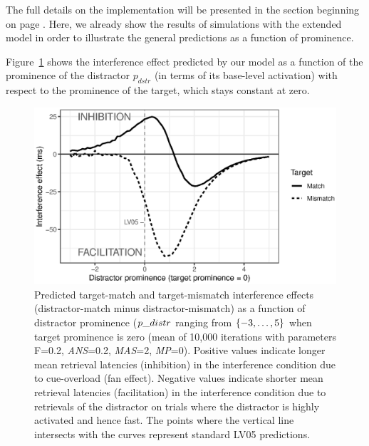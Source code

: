 \documentclass{cambridge7A}\usepackage[]{graphicx}\usepackage[]{color}
\newenvironment{knitrout}{}{} %
\newcommand{\revisedII}[1]{#1}
\newcommand{\revFE}[1]{#1}
\begin{document}
The full details on the implementation will be presented in the section beginning on page \pageref{sec:impl}. Here, we already show the results of simulations with the extended model in order to illustrate the general predictions as a function of prominence.

Figure~\ref{fig:prominenceNew} shows the \revFE{interference effect predicted by} our model as a function of the prominence of the distractor $p_{dstr}$ (in terms of its base-level activation) with respect to the prominence of the target\revFE{, which stays constant at zero}. 

\begin{figure}[!htbp]
\centering
%
\begin{knitrout}
\color{fgcolor}

{\centering \includegraphics[width=.8\textwidth]{figures/fig-prominenceNew-1} 

}



\end{knitrout}
 \caption{Predicted target-match and target-mismatch interference effects (distractor-match minus distractor-mismatch) as a function of distractor prominence ($\protect p\_{distr}$ ranging from $\protect\{-3,\dots,5\}$ when target prominence is zero (mean of 10,000 iterations with parameters F=0.2, \textit{ANS}=0.2, \textit{MAS}=2, \textit{MP}=0). Positive values indicate longer mean retrieval latencies (inhibition) in the interference condition due to cue-overload (fan effect). Negative values indicate shorter mean retrieval latencies (facilitation) in the interference condition due to retrievals of the distractor on trials where the distractor is highly activated and hence fast. The points where the vertical line intersects with the curves represent standard LV05 predictions.}\label{fig:prominenceNew} 
\end{figure}
\end{document}

